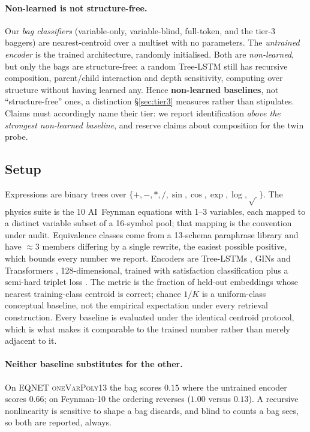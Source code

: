\paragraph{Non-learned is not structure-free.} Our \emph{bag classifiers} (variable-only,
variable-blind, full-token, and the tier-3 baggers) are nearest-centroid over a multiset with no
parameters. The \emph{untrained encoder} is the trained architecture, randomly initialised. Both are
\emph{non-learned}, but only the bags are structure-free: a random Tree-LSTM still has recursive
composition, parent/child interaction and depth sensitivity, computing over structure without having
learned any. Hence \textbf{non-learned baselines}, not ``structure-free'' ones, a distinction
\S\ref{sec:tier3} measures rather than stipulates. Claims must accordingly name their tier: we report
identification \emph{above the strongest non-learned baseline}, and reserve claims about composition
for the twin probe.

\subsection{Setup}
\label{sec:setup}

Expressions are binary trees over $\{+, -, *, /, \sin, \cos, \exp, \log, \sqrt{\ }\}$. The physics
suite is the 10 AI~Feynman equations \citep{udrescu2020ai} with 1--3 variables, each mapped to a
distinct variable subset of a 16-symbol pool; that mapping is the convention under audit.
Equivalence classes come from a 13-schema paraphrase library and have ${\approx}3$ members differing
by a single rewrite, the easiest possible positive, which bounds every number we report. Encoders
are Tree-LSTMs \citep{tai2015improved}, GINs \citep{xu2019powerful} and Transformers
\citep{vaswani2017attention}, 128-dimensional, trained with satisfaction classification plus a
semi-hard triplet loss \citep{schroff2015facenet}. The metric is the fraction of held-out embeddings
whose nearest training-class centroid is correct; chance $1/K$ is a uniform-class conceptual
baseline, not the empirical expectation under every retrieval construction. Every baseline is
evaluated under the identical centroid protocol, which is what makes it comparable to the trained
number rather than merely adjacent to it.

\paragraph{Neither baseline substitutes for the other.} On EQNET \textsc{oneVarPoly13} the bag
scores $0.15$ where the untrained encoder scores $0.66$; on Feynman-10 the ordering reverses ($1.00$
versus $0.13$). A recursive nonlinearity is sensitive to shape a bag discards, and blind to counts a
bag sees, so both are reported, always.
